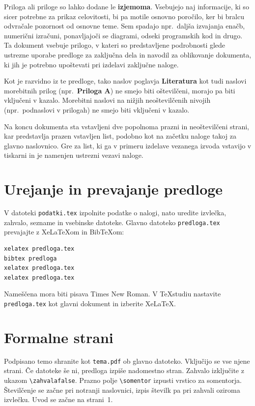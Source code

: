 \label{cha:priloga}
\setlength{\emergencystretch}{3em}
Priloga ali priloge so lahko dodane le \textbf{izjemoma}. Vsebujejo naj informacije, ki so sicer potrebne za prikaz celovitosti, bi pa motile osnovno poročilo, ker bi bralcu odvračale pozornost od osnovne teme. Sem spadajo npr.~daljša izvajanja enačb, numerični izračuni, ponavljajoči se diagrami, odseki programskih kod in drugo. Ta dokument vsebuje prilogo, v kateri so predstavljene podrobnosti glede ustrezne uporabe predloge za zaključna dela in navodil za oblikovanje dokumenta, ki jih je potrebno upoštevati pri izdelavi zaključne naloge.

Kot je razvidno iz te predloge, tako naslov poglavja \textbf{Literatura} kot tudi naslovi morebitnih prilog (npr.~\textbf{Priloga A}) ne smejo biti oštevilčeni, morajo pa biti vključeni v kazalo. Morebitni naslovi na nižjih neoštevilčenih nivojih (npr.~podnaslovi v prilogah) ne smejo biti vključeni v kazalo.

Na koncu dokumenta sta vstavljeni dve popolnoma prazni in neoštevilčeni strani, kar predstavlja prazen vstavljen list, podobno kot na začetku naloge takoj za glavno naslovnico. Gre za list, ki ga v primeru izdelave vezanega izvoda vstavijo v tiskarni in je namenjen ustrezni vezavi naloge.

\section*{Urejanje in prevajanje predloge}
V datoteki \texttt{podatki.tex} izpolnite podatke o nalogi, nato uredite izvlečka, zahvalo, sezname in vsebinske datoteke. Glavno datoteko \texttt{predloga.tex} prevajajte z XeLaTeXom in BibTeXom:
\begin{verbatim}
xelatex predloga.tex
bibtex predloga
xelatex predloga.tex
xelatex predloga.tex
\end{verbatim}
Nameščena mora biti pisava Times New Roman. V TeXstudiu nastavite \texttt{predloga.tex} kot glavni dokument in izberite XeLaTeX.

\section*{Formalne strani}
Podpisano temo shranite kot \texttt{tema.pdf} ob glavno datoteko. Vključijo se vse njene strani. Če datoteke še ni, predloga izpiše nadomestno stran. Zahvalo izključite z ukazom \verb|\zahvalafalse|. Prazno polje \verb|\somentor| izpusti vrstico za somentorja. Številčenje se začne pri notranji naslovnici, izpis številk pa pri zahvali oziroma izvlečku. Uvod se začne na strani~1.

